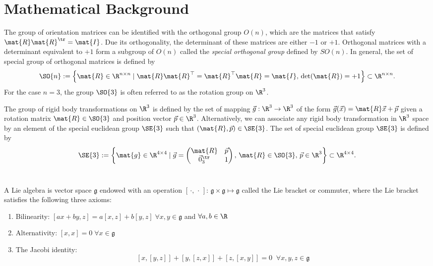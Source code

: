 \chapter{Mathematical Background}

\begin{definition} The group of orientation matrices can be identified with the orthogonal group $O(n)$, which are the matrices that satisfy $\mat{R}\mat{R}^\tr = \mat{I}$. Due its orthogonality, the determinant of these matrices are either $-1$ or $+1$. Orthogonal matrices with a determinant equivalent to $+1$ form a subgroup of $O(n)$ called the \textit{special orthogonal group} defined by $SO(n)$. In general, the set of special group of orthogonal matrices is defined by
\begin{equation}
\SO{n}:= \left\{ \mat{R}\in \R^{n \times n} \; | \; {\mat{R}} \mat{R}^\top = {\mat{R}}^\top \mat{R} = \mat{I}, \, \det(\mat{R}) = +1 \right\} \subset \R^{n\times n}.
\end{equation}
For the case $n = 3$, the group $\SO{3}$ is often referred to as the rotation group on $\R^3$.
\end{definition}

\begin{definition} The group of rigid body transformations on $\R^3$ is defined by the set of mapping $\vec{g}: \R^3 \to \R^3$ of the form $\vec{g} (\vec{x}) = \mat{R} \vec{x} + \vec{p}$ given a rotation matrix $\mat{R} \in \SO{3}$ and position vector $\vec{p} \in \R^3$. Alternatively, we can associate any rigid body transformation in $\R^3$ space by an element of the special euclidean group $\SE{3}$ such that $(\mat{R},\vec{p}) \in \SE{3}$. The set of special euclidean group $\SE{3}$ is defined by
\begin{equation}
\SE{3} := \left\{ \mat{g} \in \R^{4 \times 4} \;|\; \vec{g} = \begin{pmatrix} \mat{R} & \vec{p} \\ \vec{0}_3^\tr & 1 \end{pmatrix}, \, \mat{R} \in \SO{3},\, \vec{p} \in \R^3 \right\} \subset \R^{4\times 4}.
\end{equation}\
\end{definition}

\begin{definition}[The Lie algebra] A Lie algebra is vector space $\mathfrak{g}$ endowed with an operation $[\,\cdot,\,\cdot\,]:\, \mathfrak{g} \times \mathfrak{g} \mapsto \mathfrak{g}$ called the Lie bracket or commuter, where the Lie bracket satisfies the following three axioms: 
\begin{enumerate}
\itemsep0.5em 
\item Bilinearity: $[ax + by,z] = a[x,z] + b[y,z] \; \forall x,y\in \mathfrak{g}$ and $\forall a,b \in \R$
\item Alternativity: $[x,x] =  0 \; \forall x\in \mathfrak{g}$
\item The Jacobi identity: $$ [x,[y,z]] + [y,[z,x]] + [z,[x,y]] = 0 \;\; \forall x,y,z\in \mathfrak{g}$$
\end{enumerate}
\end{definition}

